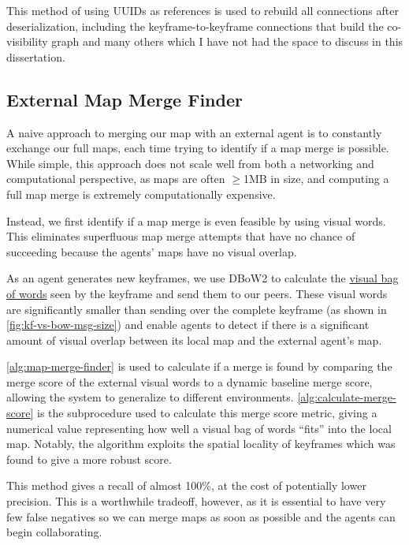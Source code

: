 This method of using UUIDs as references is used to rebuild all connections after deserialization, including the keyframe-to-keyframe connections that build the co-visibility graph and many others which I have not had the space to discuss in this dissertation.

\subsection{External Map Merge Finder}
\label{sec:external-map-merge-finder}
A naive approach to merging our map with an external agent is to constantly exchange our full maps, each time trying to identify if a map merge is possible. While simple, this approach does not scale well from both a networking and computational perspective, as maps are often $\geq$1MB in size, and computing a full map merge is extremely computationally expensive.

Instead, we first identify if a map merge is even feasible by using visual words. This eliminates superfluous map merge attempts that have no chance of succeeding because the agents' maps have no visual overlap.

As an agent generates new keyframes, we use DBoW2 \autocite{GalvezTRO12} to calculate the \hyperref[sec:visual-bag-of-words]{visual bag of words} seen by the keyframe and send them to our peers. These visual words are significantly smaller than sending over the complete keyframe (as shown in \autoref{fig:kf-vs-bow-msg-size}) and enable agents to detect if there is a significant amount of visual overlap between its local map and the external agent's map.

\autoref{alg:map-merge-finder} is used to calculate if a merge is found by comparing the merge score of the external visual words to a dynamic baseline merge score, allowing the system to generalize to different environments. \autoref{alg:calculate-merge-score} is the subprocedure used to calculate this merge score metric, giving a numerical value representing how well a visual bag of words ``fits'' into the local map. Notably, the algorithm exploits the spatial locality of keyframes which was found to give a more robust score.

This method gives a recall of almost 100\%, at the cost of potentially lower precision. This is a worthwhile tradeoff, however, as it is essential to have very few false negatives so we can merge maps as soon as possible and the agents can begin collaborating.

